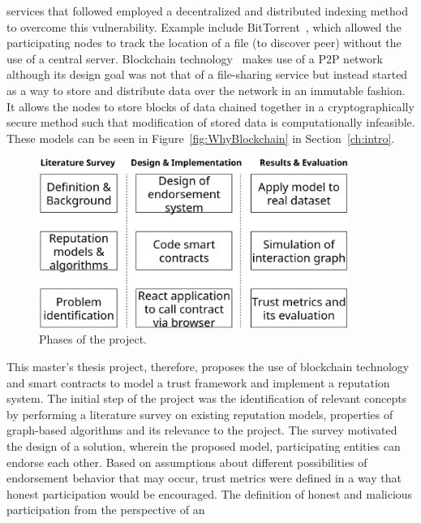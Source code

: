 services that followed employed a decentralized and distributed indexing method
to overcome this vulnerability. Example include
BitTorrent~\cite{cohen2003incentives,cohen2008bittorrent}, which allowed the
participating nodes to track the location of a file (to discover peer) without
the use of a central server. Blockchain technology~\cite{atzori2015blockchain}
makes use of a P2P network although its design goal was not that of a
file-sharing service but instead started as a way to store and distribute data
over the network in an immutable fashion. It allows the nodes to store blocks
of data chained together in a cryptographically secure method such that
modification of stored data is computationally infeasible. These models can be
seen in Figure~\ref{fig:WhyBlockchain} in Section~\ref{ch:intro}.  \par
\begin{figure}[H]
	\begin{center}
		\includegraphics[width=0.9\textwidth]{Images/workflow.eps}
		\caption{Phases of the project.}
		\label{fig:thesisSteps}
	\end{center}
\end{figure}
\vspace{-8mm}
This master’s thesis project, therefore, proposes the use of blockchain
technology and smart contracts to model a trust framework and implement a
reputation system. The initial step of the project was the identification of
relevant concepts by performing a literature survey on existing reputation
models, properties of graph-based algorithms and its relevance to the project.
The survey motivated the design of a solution, wherein the proposed model,
participating entities can endorse each other. Based on assumptions about
different possibilities of endorsement behavior that may occur, trust metrics
were defined in a way that honest participation would be encouraged. The
definition of honest and malicious participation from the perspective of an
